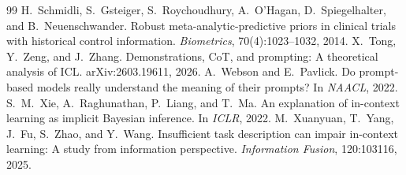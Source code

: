 \documentclass[10pt,letterpaper]{article}
\begin{document}
\begin{thebibliography}{99}
 H.~Schmidli, S.~Gsteiger, S.~Roychoudhury, A.~O'Hagan, D.~Spiegelhalter, and B.~Neuenschwander. Robust meta-analytic-predictive priors in clinical trials with historical control information. \emph{Biometrics}, 70(4):1023--1032, 2014.
 X.~Tong, Y.~Zeng, and J.~Zhang. Demonstrations, CoT, and prompting: A theoretical analysis of ICL. arXiv:2603.19611, 2026.
 A.~Webson and E.~Pavlick. Do prompt-based models really understand the meaning of their prompts? In \emph{NAACL}, 2022.
 S.~M.~Xie, A.~Raghunathan, P.~Liang, and T.~Ma. An explanation of in-context learning as implicit Bayesian inference. In \emph{ICLR}, 2022.
 M.~Xuanyuan, T.~Yang, J.~Fu, S.~Zhao, and Y.~Wang. Insufficient task description can impair in-context learning: A study from information perspective. \emph{Information Fusion}, 120:103116, 2025.
\end{thebibliography}
\end{document}
